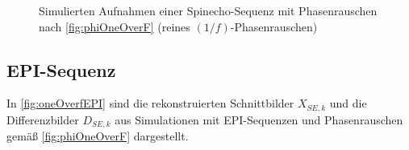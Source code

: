 \begin{figure}[H]
	\hfill
	\hfill
	\caption[($1/f$)-Rauschen (Spinecho-Sequenz)]{Simulierten Aufnahmen einer Spinecho-Sequenz mit Phasenrauschen nach \autoref{fig:phiOneOverF}  (reines $(1/f)$-Phasenrauschen)}
	\label{fig:oneOverfSE}	
\end{figure}

\clearpage
\subsection{EPI-Sequenz}
In \autoref{fig:oneOverfEPI} sind die rekonstruierten Schnittbilder $X_{SE,k}$ und die Differenzbilder $D_{SE,k}$ aus Simulationen mit EPI-Sequenzen und Phasenrauschen gemäß \autoref{fig:phiOneOverF} dargestellt.

